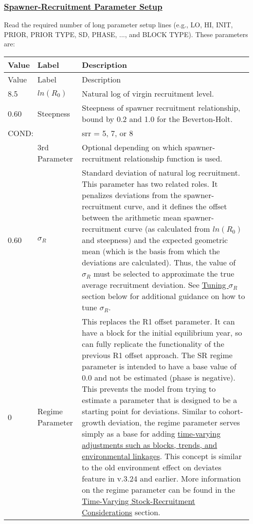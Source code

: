 \subsubsection[Spawner-Recruitment Parameter Setup]{\protect\hyperlink{SRRParam}{Spawner-Recruitment Parameter Setup}}
Read the required number of long parameter setup lines (e.g., LO, HI, INIT, PRIOR, PRIOR TYPE, SD, PHASE, ..., and BLOCK TYPE). These parameters are:
\begin{longtable}{p{1cm} p{3cm} p{11cm}}
	\hline
	Value & Label & Description \Tstrut\Bstrut\\
	\hline
	\endfirsthead

	\hline
	Value & Label & Description \Tstrut\Bstrut\\
	\hline
	\endhead
	\hline
	\endfoot
	\endlastfoot

	8.5 & $ln(R_{0})$ & Natural log of virgin recruitment level. \Tstrut\Bstrut\\
	\hline

	0.60 \Tstrut & Steepness & Steepness of spawner recruitment relationship, bound by 0.2 and 1.0 for the Beverton-Holt. \Bstrut\\

	\multicolumn{2}{l}{COND:} \Tstrut & \gls{srr} = 5, 7, or 8 \\
	& 3rd Parameter & Optional depending on which spawner-recruitment relationship function is used. \Bstrut\\
	\hline

	0.60 \Tstrut & $\sigma_R$ & Standard deviation of natural log recruitment. This parameter has two related roles. It penalizes deviations from the spawner-recruitment curve, and it defines the offset between the arithmetic mean spawner-recruitment curve (as calculated from $ln(R_{0})$ and steepness) and the expected geometric mean (which is the basis from which the deviations are calculated). Thus, the value of $\sigma_R$ must be selected to approximate the true average recruitment deviation. See \hyperlink{TuneSigmaR}{Tuning $\sigma_R$} section below for additional guidance on how to tune $\sigma_R$. \Bstrut\\
	\hline

	0 \Tstrut & Regime Parameter & This replaces the R1 offset parameter. It can have a block for the initial equilibrium year, so can fully replicate the functionality of the previous R1 offset approach. The SR regime parameter is intended to have a base value of 0.0 and not be estimated (phase is negative). This prevents the model from trying to estimate a parameter that is designed to be a starting point for deviations. Similar to cohort-growth deviation, the regime parameter serves simply as a base for adding \hyperlink{SpecTVLong}{time-varying adjustments such as blocks, trends, and environmental linkages}. This concept is similar to the old environment effect on deviates feature in v.3.24 and earlier. More information on the regime parameter can be found in the \hyperlink{tv-sr}{Time-Varying Stock-Recruitment Considerations} section. \Bstrut\\
	\hline


\end{longtable}
